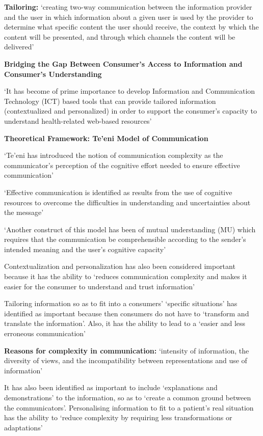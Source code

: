 \documentclass[]{article}
\begin{document}
\textbf{Tailoring:} ‘creating two-way communication between the information provider and the user in which information about a given user is used by the provider to determine what specific content the user should receive, the context by which the content will be presented, and through which channels the content will be delivered’

\textbf{Bridging the Gap Between Consumer’s Access to Information and Consumer’s Understanding}

‘It has become of prime importance to develop Information and Communication Technology (ICT) based tools that can provide tailored information (contextualized and personalized) in order to support the consumer’s capacity to understand health-related web-based resources’

\textbf{Theoretical Framework: Te’eni Model of Communication}

‘Te’eni has introduced the notion of communication complexity as the communicator’s perception of the cognitive effort needed to ensure effective communication’

‘Effective communication is identified as results from the use of cognitive resources to overcome the difficulties in understanding and uncertainties about the message’

‘Another construct of this model has been of mutual understanding (MU) which requires that the communication be comprehensible according to the sender’s intended meaning and the user’s cognitive capacity’

Contextualization and personalization has also been considered important because it has the ability to ‘reduces communication complexity and makes it easier for the consumer to understand and trust information’
 
Tailoring information so as to fit into a consumers’ ‘specific situations’ has identified as important because then consumers do not have to ‘transform and translate the information’. Also, it has the ability to lead to a ‘easier and less erroneous communication’ 
 
\textbf{Reasons for complexity in communication:} ‘intensity of information, the diversity of views, and the incompatibility between representations and use of information’

It has also been identified as important to include ‘explanations and demonstrations’ to the information, so as to ‘create a common ground between the communicators’. Personalising information to fit to a patient’s real situation has the ability to ‘reduce complexity by requiring less transformations or adaptations’
\end{document}
